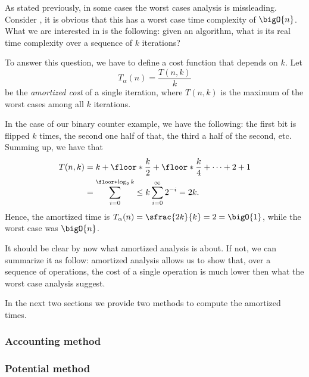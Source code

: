 \documentclass{subfiles}
\begin{document}
\label{Sec:1.2}
    As stated previously, in some cases the worst cases analysis is missleading.
        Consider , it is obvious that this has a worst case time complexity of \(\bigO{n}\).
        What we are interested in is the following: given an algorithm, what is its real time complexity 
        over a sequence of \(k\) iterations?
        

    To answer this question, we have to define a cost function that depends on \(k\).
        Let 
        \[
            T_{\alpha}(n) = \frac{T(n, k)}{k}
        \]
        be the \emph{amortized cost} of a single iteration, 
        where \(T(n, k)\) is the maximum of the worst cases among all \(k\) iterations.

    In the case of our binary counter example, we have the following: 
        the first bit is flipped \(k\) times, the second one half of that, 
        the third a half of the second, etc. Summing up, we have that 
        \[\begin{aligned}
             T(n, k) & = k + \floor*{\frac{k}{2}} + \floor*{\frac{k}{4}} + \cdots + 2 + 1 \\
                & = \sum_{i = 0}^{\floor*{\log_{2} k}} \le k \sum_{i = 0}^{\infty} 2^{-i} = 2k.
        \end{aligned}\] 
        Hence, the amortized time is \(T_{\alpha}(n) = \sfrac{2k}{k} = 2 = \bigO{1}\),
            while the worst case was \(\bigO{n}\).

    It should be clear by now what amortized analysis is about. If not, 
        we can summarize it as follow: amortized analysis allows us to show that, 
        over a sequence of operations, the cost of a single operation is much lower 
        then what the worst case analysis suggest.


    In the next two sections we provide two methods to compute the amortized times.

    \subsubsection{Accounting method}
    

    \subsubsection{Potential method}
    
    \clearpage
\end{document}
